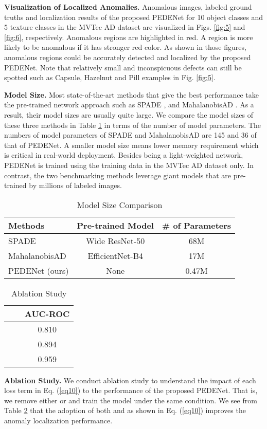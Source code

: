 \documentclass{article}
\begin{document}
\textbf{Visualization of Localized Anomalies.} Anomalous images, labeled
ground truths and localization results of the proposed PEDENet for 10
object classes and 5 texture classes in the MVTec AD dataset are
visualized in Figs.  \ref{fig:5} and \ref{fig:6}, respectively.
Anomalous regions are highlighted in red. A region is more likely to be
anomalous if it has stronger red color. As shown in those figures,
anomalous regions could be accurately detected and localized by the
proposed PEDENet. Note that relatively small and inconspicuous defects
can still be spotted such as Capsule, Hazelnut and Pill examples in Fig.
\ref{fig:5}. 

\textbf{Model Size.} Most state-of-the-art methods that give the best
performance take the pre-trained network approach such as SPADE
\cite{cohen2020sub}, and MahalanobisAD \cite{rippel2020modeling}.  As a
result, their model sizes are usually quite large. We compare the model
sizes of these three methods in Table \ref{tab3} in terms of the number
of model parameters. The numbers of model parameters of SPADE and
MahalanobisAD are 145 and 36 of that of PEDENet.  A
smaller model size means lower memory requirement which is critical in
real-world deployment. Besides being a light-weighted network, PEDENet
is trained using the training data in the MVTec AD dataset only. In
contrast, the two benchmarking methods leverage giant models that are
pre-trained by millions of labeled images. 

\begin{table}[htbp]
  \begin{center}
    \caption{Model Size Comparison}\label{tab3} 
    \begin{tabular}{|l|c|c|} \hline
      \textbf{Methods} & Pre-trained Model & \# of Parameters \\ \hline
      SPADE & Wide ResNet-50 & 68M \\ \hline
      MahalanobisAD & EfficientNet-B4 & 17M \\ \hline
      PEDENet (ours) & None & 0.47M \\ \hline
    \end{tabular}
  \end{center}
\end{table}
\begin{table}[htb]
  \begin{center}
    \caption{Ablation Study}\label{tab4} 
    \begin{tabular}{c|c|c} \hline
       &  & AUC-ROC \\ \hline
       & & 0.810 \\
      &  & 0.894 \\
       &  & 0.959 \\ \hline
    \end{tabular}
  \end{center}
\end{table}
\textbf{Ablation Study.} We conduct ablation study to understand the
impact of each loss term in Eq. (\ref{eq10}) to the performance of the
proposed PEDENet. That is, we remove either  or
 and train the model under the same condition. We see
from Table \ref{tab4} that the adoption of both  and
 as shown in Eq. (\ref{eq10}) improves the anomaly
localization performance. 
\end{document}
